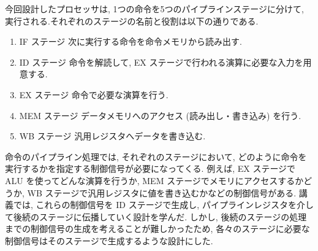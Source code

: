 \documentclass[../specifications.tex]{subfiles}
\begin{document}
  今回設計したプロセッサは, 1つの命令を5つのパイプラインステージに分けて, 
  実行される.それぞれのステージの名前と役割は以下の通りである.
  \begin{enumerate}
    \item IF ステージ
    \newline 次に実行する命令を命令メモリから読み出す.

    \item ID ステージ
    \newline 命令を解読して, EX ステージで行われる演算に必要な入力を用意する.

    \item EX ステージ
    \newline 命令で必要な演算を行う.

    \item MEM ステージ
    \newline データメモリへのアクセス (読み出し・書き込み) を行う.

    \item WB ステージ
    \newline 汎用レジスタへデータを書き込む.
  \end{enumerate}

  命令のパイプライン処理では, それぞれのステージにおいて, 
  どのように命令を実行するかを指定する制御信号が必要になってくる.
  例えば, EX ステージで ALU を使ってどんな演算を行うか, 
  MEM ステージでメモリにアクセスするかどうか, 
  WB ステージで汎用レジスタに値を書き込むかなどの制御信号がある.
  講義では, これらの制御信号を ID ステージで生成し, 
  パイプラインレジスタを介して後続のステージに伝播していく設計を学んだ.
  しかし, 後続のステージの処理までの制御信号の生成を考えることが難しかったため, 
  各々のステージに必要な制御信号はそのステージで生成するような設計にした.

  
\end{document}

